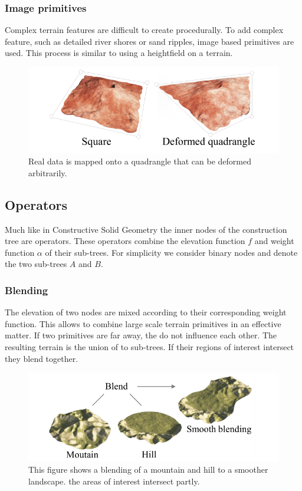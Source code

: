 \subsubsection{Image primitives}
Complex terrain features are difficult to create procedurally. To add complex feature, such as detailed river shores or sand ripples, image based primitives are used. This process is similar to using a heightfield on a terrain. 

\begin{figure}[htb]
	\centering
	\includegraphics[width=.8\linewidth]{GGP15/image_primitive}
	\caption{Real data is mapped onto a quadrangle that can be deformed arbitrarily.}
	\label{fig:image_primitive}
\end{figure}


\subsection{Operators}
Much like in Constructive Solid Geometry the inner nodes of the construction tree are operators. These operators combine the elevation function $f$ and weight function $\alpha$ of their sub-trees. For simplicity we consider binary nodes and denote the two sub-trees $A$ and $B$. 

\subsubsection{Blending}
The elevation of two nodes are mixed according to their corresponding weight function. This allows to combine large scale terrain primitives in an effective matter. If two primitives are far away, the do not influence each other. The resulting terrain is the union of to sub-trees. If their regions of interest intersect they blend together.
\begin{figure}[htb]
	\centering
	\includegraphics[width=.8\linewidth]{GGP15/blend_operator}
	\caption{This figure shows a blending of a mountain and hill to a smoother landscape. the areas of interest intersect partly. }
	\label{fig:blend_operator}
\end{figure}
